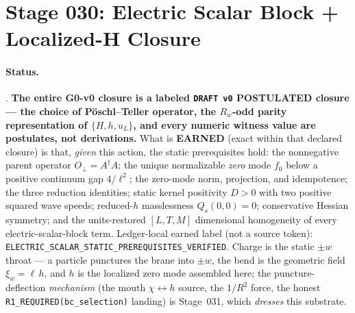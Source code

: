 \section{Stage 030: Electric Scalar Block + Localized-H Closure}

\claimstatus{\StatusExactClosure}

\paragraph{Status.}
\StatusExactClosure. \textbf{The entire G0-v0 closure is a labeled
\texttt{DRAFT v0} POSTULATED closure --- the choice of P\"oschl--Teller
operator, the \(R_w\)-odd parity representation of \(\{H,h,u_L\}\), and every
numeric witness value are postulates, not derivations.} What is \textbf{EARNED}
(exact within that declared closure) is that, \emph{given} this action, the
static prerequisites hold: the nonnegative parent operator \(O_\perp=A^\dagger
A\); the unique normalizable \emph{zero} mode \(f_0\) below a positive continuum
gap \(4/\ell^2\); the zero-mode norm, projection, and idempotence; the three
reduction identities; static kernel positivity \(D>0\) with two positive
squared wave speeds; reduced-\(h\) masslessness \(Q_s(0,0)=0\); conservative
Hessian symmetry; and the units-restored \([L,T,M]\) dimensional homogeneity of
every electric-scalar-block term. Ledger-local earned label (not a source
token): \texttt{ELECTRIC\_SCALAR\_STATIC\_PREREQUISITES\_VERIFIED}. Charge is
the static \(\pm w\) throat --- a particle punctures the brane into \(\pm w\),
the bend is the geometric field \(\xi_w=\ell\,h\), and \(h\) is the localized
zero mode assembled here; the puncture-deflection \emph{mechanism} (the mouth
\(\chi\leftrightarrow h\) source, the \(1/R^2\) force, the honest
\texttt{R1\_REQUIRED(bc\_selection)} landing) is Stage~031, which \emph{dresses}
this substrate.

